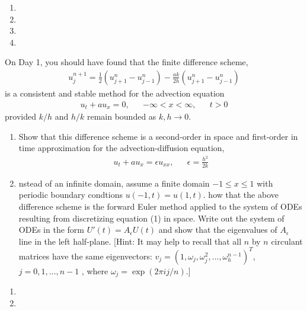 \documentclass[10pt]{article}
\begin{document}
\begin{solution}[Solution]
\begin{enumerate}[label=(\alph*)]
    \item
    \item
    \item
    \item
\end{enumerate}

\end{solution}


\begin{problem}
On Day 1,  you should have found that the finite difference scheme,
\begin{align*}
    u_j^{n+1} = \frac{1}{2} \left( u_{j+1}^n - u_{j-1}^n \right) - \frac{ak}{2h} \left( u_{j+1}^n - u_{j-1}^n \right)
\end{align*}
is a consistent and stable method for the advection equation
\begin{align*}
    u_t + au_x = 0, && -\infty < x < \infty, && t>0
\end{align*}
provided \( k/h \) and \( h/k \) remain bounded as \( k,h\to 0 \).
\begin{enumerate}[nolistsep,label=(\alph*)]
    \item Show that this difference scheme is a second-order in space and first-order in
time approximation for the advection-diffusion equation,
\begin{align*}
    u_t + au_x = \epsilon u_{xx}, && \epsilon = \frac{h^2}{2k}
\end{align*}
    \item nstead of an infinite domain, assume a finite domain \( -1 \leq x\leq 1 \) with periodic boundary condtions \( u(-1,t) = u(1,t) \). how that the above difference scheme is the forward Euler method applied to the system of ODEs resulting from discretizing equation (1) in space. Write out the system of ODEs in the form \( U'(t) = A_{\epsilon} U(t) \) and show that the eigenvalues of \( A_{\epsilon} \) line in the left half-plane. [Hint: It may help to recall that all \( n \) by \( n \) circulant matrices have the same eigenvectors: \( v_j = (1, \omega_j , \omega_j^2 , \ldots , \omega_h^{n-1})^T\), \(j = 0, 1, \ldots , n-1\) , where \( \omega_j = \exp(2\pi ij/n) \).]
\end{enumerate}
\end{problem}

\begin{solution}[Solution]
\begin{enumerate}[label=(\alph*)]
    \item
    \item
\end{enumerate}

\end{solution}
\end{document}
